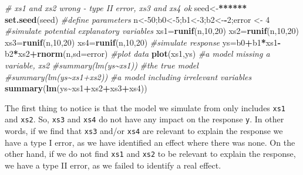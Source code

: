 \documentclass[
]{book}
\newenvironment{Shaded}{\begin{snugshade}}{\end{snugshade}}
\newcommand{\AttributeTok}[1]{\textcolor[rgb]{0.13,0.29,0.53}{#1}}
\newcommand{\CommentTok}[1]{\textcolor[rgb]{0.56,0.35,0.01}{\textit{#1}}}
\newcommand{\DecValTok}[1]{\textcolor[rgb]{0.00,0.00,0.81}{#1}}
\newcommand{\ErrorTok}[1]{\textcolor[rgb]{0.64,0.00,0.00}{\textbf{#1}}}
\newcommand{\FunctionTok}[1]{\textcolor[rgb]{0.13,0.29,0.53}{\textbf{#1}}}
\newcommand{\NormalTok}[1]{#1}
\newcommand{\OtherTok}[1]{\textcolor[rgb]{0.56,0.35,0.01}{#1}}
\newcommand{\SpecialCharTok}[1]{\textcolor[rgb]{0.81,0.36,0.00}{\textbf{#1}}}
\begin{document}
\begin{Shaded}
\begin{Highlighting}[]
\CommentTok{\# xs1 and xs2 wrong {-} type II error, xs3 and xs4 ok}
\NormalTok{seed}\OtherTok{\textless{}{-}}\ErrorTok{******}
\FunctionTok{set.seed}\NormalTok{(seed)}
\CommentTok{\#define parameters}
\NormalTok{n}\OtherTok{\textless{}{-}}\DecValTok{50}\NormalTok{;b0}\OtherTok{\textless{}{-}}\DecValTok{5}\NormalTok{;b1}\OtherTok{\textless{}{-}}\DecValTok{3}\NormalTok{;b2}\OtherTok{\textless{}{-}}\SpecialCharTok{{-}}\DecValTok{2}\NormalTok{;error }\OtherTok{\textless{}{-}} \DecValTok{4}
\CommentTok{\#simulate potential explanatory variables}
\NormalTok{xs1}\OtherTok{=}\FunctionTok{runif}\NormalTok{(n,}\DecValTok{10}\NormalTok{,}\DecValTok{20}\NormalTok{)}
\NormalTok{xs2}\OtherTok{=}\FunctionTok{runif}\NormalTok{(n,}\DecValTok{10}\NormalTok{,}\DecValTok{20}\NormalTok{)}
\NormalTok{xs3}\OtherTok{=}\FunctionTok{runif}\NormalTok{(n,}\DecValTok{10}\NormalTok{,}\DecValTok{20}\NormalTok{)}
\NormalTok{xs4}\OtherTok{=}\FunctionTok{runif}\NormalTok{(n,}\DecValTok{10}\NormalTok{,}\DecValTok{20}\NormalTok{)}
\CommentTok{\#simulate response}
\NormalTok{ys}\OtherTok{=}\NormalTok{b0}\SpecialCharTok{+}\NormalTok{b1}\SpecialCharTok{*}\NormalTok{xs1}\SpecialCharTok{{-}}\NormalTok{b2}\SpecialCharTok{*}\NormalTok{xs2}\SpecialCharTok{+}\FunctionTok{rnorm}\NormalTok{(n,}\AttributeTok{sd=}\NormalTok{error)}
\CommentTok{\#plot data}
\FunctionTok{plot}\NormalTok{(xs1,ys)}
\CommentTok{\#a model missing a variable, xs2}
\CommentTok{\#summary(lm(ys\textasciitilde{}xs1))}
\CommentTok{\#the true model}
\CommentTok{\#summary(lm(ys\textasciitilde{}xs1+xs2))}
\CommentTok{\#a model including irrelevant variables}
\FunctionTok{summary}\NormalTok{(}\FunctionTok{lm}\NormalTok{(ys}\SpecialCharTok{\textasciitilde{}}\NormalTok{xs1}\SpecialCharTok{+}\NormalTok{xs2}\SpecialCharTok{+}\NormalTok{xs3}\SpecialCharTok{+}\NormalTok{xs4))}
\end{Highlighting}
\end{Shaded}

The first thing to notice is that the model we simulate from only includes \texttt{xs1} and \texttt{xs2}. So, \texttt{xs3} and \texttt{xs4} do not have any impact on the response \texttt{y}. In other words, if we find that \texttt{xs3} and/or \texttt{xs4} are relevant to explain the response we have a type I error, as we have identified an effect where there was none. On the other hand, if we do not find \texttt{xs1} and \texttt{xs2} to be relevant to explain the response, we have a type II error, as we failed to identify a real effect.
\end{document}
